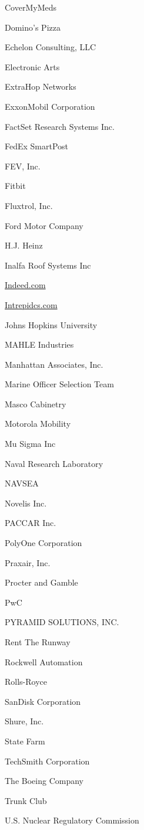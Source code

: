 \documentclass[twoside]{article}
\begin{document}
\begin{center}
\begin{multicols}{5}
\begin{FlushLeft}
\begin{compactitem}
\item CoverMyMeds
\item Domino's Pizza
\item Echelon Consulting, LLC
\item Electronic Arts
\item ExtraHop Networks
\item ExxonMobil Corporation
\item FactSet Research Systems Inc.
\item FedEx SmartPost
\item FEV, Inc.
\item Fitbit
\item Fluxtrol, Inc.
\item Ford Motor Company
\item H.J. Heinz
\item Inalfa Roof Systems Inc
\item \url{Indeed.com}
\item \url{Intrepidcs.com}
\item Johns Hopkins University
\item MAHLE Industries
\item Manhattan Associates, Inc.
\item Marine Officer Selection Team
\item Masco Cabinetry
\item Motorola Mobility
\item Mu Sigma Inc
\item Naval Research Laboratory
\item NAVSEA
\item Novelis Inc.
\item PACCAR Inc.
\item PolyOne Corporation
\item Praxair, Inc.
\item Procter and Gamble
\item PwC
\item PYRAMID SOLUTIONS, INC.
\item Rent The Runway
\item Rockwell Automation
\item Rolls-Royce
\item SanDisk Corporation
\item Shure, Inc.
\item State Farm
\item TechSmith Corporation
\item The Boeing Company
\item Trunk Club
\item U.S. Nuclear Regulatory Commission

\end{compactitem}
\end{FlushLeft}
\end{multicols}
\end{center}
\end{document}
